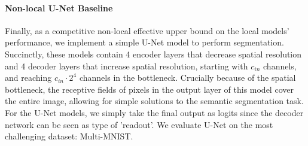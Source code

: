 \paragraph{Non-local U-Net Baseline} Finally, as a competitive non-local effective upper bound on the local models' performance, we implement a simple U-Net model \citep{ronneberger_u-net_2015} to perform segmentation. Succinctly, these models contain 4 encoder layers that decrease spatial resolution and 4 decoder layers that increase spatial resolution, starting with $c_{in}$ channels, and reaching $c_{in} \cdot 2^4$ channels in the bottleneck. Crucially because of the spatial bottleneck, the receptive fields of pixels in the output layer of this model cover the entire image, allowing for simple solutions to the semantic segmentation task. For the U-Net models, we simply take the final output as logits since the decoder network can be seen as type of 'readout'. We evaluate U-Net on the most challenging dataset: Multi-MNIST.